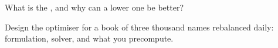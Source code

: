 \begin{interviewq}\label{iq:rs:portfolio-construction-i:5}
What is the , and why can a lower one be better?
\end{interviewq}

\begin{interviewq}\label{iq:rs:portfolio-construction-i:6}
Design the optimiser for a book of three thousand names rebalanced daily: formulation, solver, and what you precompute.
\end{interviewq}
